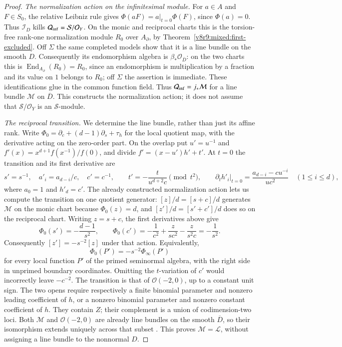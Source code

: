 \documentclass[10pt,fleqn]{article}
\numberwithin{equation}{section}
\begin{document}
\begin{proof}
\emph{The normalization action on the infinitesimal module.}
\label{r23:mixed:normalization-action}
For $a\in A$ and $F\in S_0$, the relative Leibniz rule gives
$\Phi(aF)=a|_{t=0}\Phi(F)$, since $\Phi(a)=0$.
Thus $\mathcal I_D$ kills $\mathcal Q_{\rm inf}=\mathcal S/\mathcal O_Y$.
On the monic and reciprocal charts this is the torsion-free rank-one
normalization module $R_0$ over $A_\partial$, by
Theorem~\ref{v8r9:mixed:first-excluded}.  Off $\Sigma$ the same completed
models show that it is a line bundle on the smooth $D$.
Consequently its endomorphism algebra is $\beta_*\mathcal O_{\overline D}$:
on the two charts this is
$\operatorname{End}_{A_\partial}(R_0)=R_0$, since an endomorphism is
multiplication by a fraction and its value on $1$ belongs to $R_0$;
off $\Sigma$ the assertion is immediate.  These identifications glue in
the common function field.  Thus $\mathcal Q_{\rm inf}=j_*\mathcal M$
for a line bundle $\mathcal M$ on $\overline D$.  This constructs the
normalization action; it does not assume that $\mathcal S/\mathcal O_Y$
is an $\mathcal S$-module.

\emph{The reciprocal transition.}
We determine the line bundle, rather than just its affine rank.  Write
$\Phi_0=\partial_c+(d-1)\partial_s+\tau_h$ for the local quotient map,
with the derivative acting on the zero-order part.  On the overlap put
$u'=u^{-1}$ and $f'(x)=x^{d+1}f(x^{-1})/f(0)$, and divide
$f'=(x-u')h'+t'$.  At $t=0$ the transition and its first derivative are
\[
 s'=s^{-1},\quad a'_i=a_{d-i}/c,\quad c'=c^{-1},\qquad
 t'=-\frac{t}{u^{d+2}c}\pmod{t^2},\qquad
 \left.\partial_t h'_i\right|_{t=0}
       =\frac{a_{d-i}-cu^{-i}}{uc^2}\quad(1\le i\le d),
\]
where $a_0=1$ and $h'_d=c'$.  The already constructed normalization
action lets us compute the transition on one quotient generator:
$[z]/d=[s+c]/d$ generates $\mathcal M$ on the monic chart because
$\Phi_0(z)=d$, and $[z']/d=[s'+c']/d$ does so on the reciprocal chart.
Writing $z=s+c$, the first derivatives above give
\[
 \Phi_0(s')=-\frac{d-1}{s^2},\qquad
 \Phi_0(c')=-\frac1{c^2}
       +\frac{z}{sc^2}-\frac{z}{s^2c}=-\frac1{s^2}.
\]
Consequently $[z']=-s^{-2}[z]$ under that action.  Equivalently,
\[
 \Phi_0(P')=-s^{-2}\Phi_\infty(P')
\]
for every local function $P'$ of the primed seminormal algebra, with
the right side in unprimed boundary coordinates.  Omitting the
$t$-variation of $c'$ would incorrectly leave $-c^{-2}$.
The transition is that of $\mathcal O(-2,0)$, up to a constant unit sign.
The two opens require respectively a finite binomial parameter and
nonzero leading coefficient of $h$, or a nonzero binomial parameter
and nonzero constant coefficient of $h$.  They contain $Z$; their
complement is a union of codimension-two loci.  Both $\mathcal M$ and $\mathcal O(-2,0)$ are already
line bundles on the smooth $\overline D$, so their isomorphism extends
uniquely across that subset \cite[Tag~0EBJ]{Stacks}.  This proves
$\mathcal M=\mathcal L$, without assigning a line bundle to the nonnormal
$D$.


\end{proof}
\end{document}
